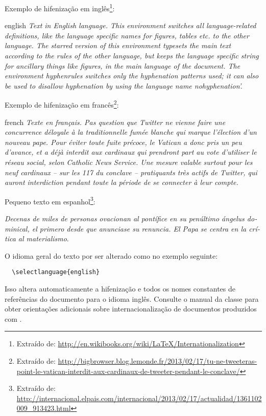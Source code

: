 Exemplo de hifenização em inglês\footnote{Extraído de: \url{http://en.wikibooks.org/wiki/LaTeX/Internationalization}}:

\begin{otherlanguage*}{english}
  \textit{Text in English language. This environment switches all language-related definitions, like the language specific names for figures, tables etc. to the other language. The starred version of this environment typesets the main text according to the rules of the other language, but keeps the language specific string for ancillary things like figures, in the main language of the document. The environment hyphenrules switches only the hyphenation patterns used; it can also be used to disallow hyphenation by using the language name nohyphenation'.}
\end{otherlanguage*}

Exemplo de hifenização em francês\footnote{Extraído de: \url{http://bigbrowser.blog.lemonde.fr/2013/02/17/tu-ne-tweeteras-point-le-vatican-interdit-aux-cardinaux-de-tweeter-pendant-le-conclave/}}:

\begin{otherlanguage*}{french}
  \textit{Texte en français. Pas question que Twitter ne vienne faire une concurrence déloyale à la traditionnelle fumée blanche qui marque l'élection d'un nouveau pape. Pour éviter toute fuite précoce, le Vatican a donc pris un peu d'avance, et a déjà interdit aux cardinaux qui prendront part au vote d'utiliser le réseau social, selon Catholic News Service. Une mesure valable surtout pour les neuf cardinaux – sur les 117 du conclave – pratiquants très actifs de Twitter, qui auront interdiction pendant toute la période de se connecter à leur compte.}
\end{otherlanguage*}

Pequeno texto em espanhol\footnote{Extraído de: \url{http://internacional.elpais.com/internacional/2013/02/17/actualidad/1361102009_913423.html}}:

\foreignlanguage{spanish}{\textit{Decenas de miles de personas ovacionan al pontífice en su penúltimo ángelus dominical, el primero desde que anunciase su renuncia. El Papa se centra en la crítica al materialismo}}.

O idioma geral do texto por ser alterado como no exemplo seguinte:

\begin{verbatim}
  \selectlanguage{english}
\end{verbatim}

Isso altera automaticamente a hifenização e todos os nomes constantes de referências do documento para o idioma inglês. Consulte o manual da classe \cite{abntex2classe} para obter orientações adicionais sobre internacionalização de documentos produzidos com \abnTeX.

